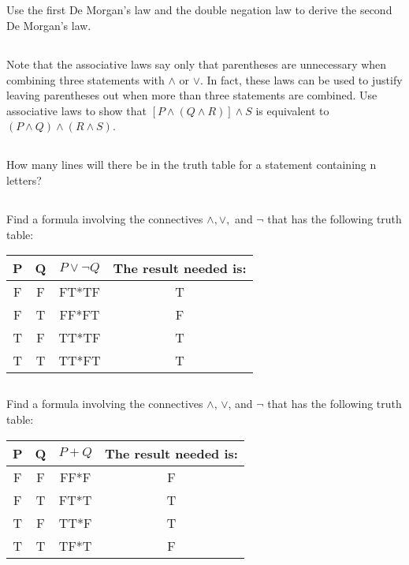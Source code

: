 \documentclass{article}
\begin{document}
\subsection{}
Use the first De Morgan’s law and the double negation law to derive
the second De Morgan’s law.
\subsection{}
Note that the associative laws say only that parentheses are
unnecessary when combining three statements with $\land$ or $\lor$. In fact,
these laws can be used to justify leaving parentheses out when more
than three statements are combined. Use associative laws to show that
$[P \land (Q \land R)] \land S$ is equivalent to $(P \land Q) \land (R \land S)$.
\subsection{}
How many lines will there be in the truth table for a statement
containing n letters?
\subsection{}
Find a formula involving the connectives $\land, \lor,$ and $\neg$ that has the
following truth table:
\begin{center}
 \begin{tabular}{||c c c c||} 
 \hline
 P & Q & $P \lor \neg Q$ & The result needed is:\\ [0.5ex] 
 \hline\hline
 F & F & FT*TF &  T\\ 
 \hline
 F & T & FF*FT &  F\\
 \hline
 T & F & TT*TF &  T\\
 \hline
 T & T & TT*FT &  T\\ [1ex] 
 \hline
\end{tabular}
\end{center}
\subsection{}
Find a formula involving the connectives $\land$, $\lor$, and $\neg$ that has the
following truth table:
\begin{center}
 \begin{tabular}{||c c c c||} 
 \hline
 P & Q & $P + Q$ & The result needed is:\\ [0.5ex] 
 \hline\hline
 F & F & FF*F &  F\\ 
 \hline
 F & T & FT*T &  T\\
 \hline
 T & F & TT*F &  T\\
 \hline
 T & T & TF*T &  F\\ [1ex] 
 \hline
\end{tabular}
\end{center}
\end{document}
